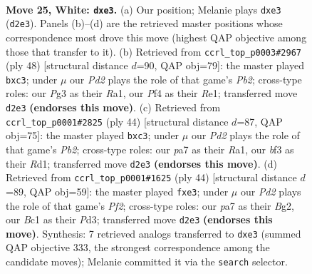 \documentclass[11pt]{article}
\begin{document}
\clearpage

\begin{figure}[p]\centering
\begin{subfigure}{0.46\textwidth}\centering
\resizebox{\linewidth}{!}{%
\newchessgame
\chessboard[
  setfen={1r3r2/pp4k1/6pp/2pB3n/4pP1P/N3bbP1/PP1P4/1RB2K2 w - - 0 25},
  showmover=false,
  pgfstyle=straightmove, color=movearrow, markmove={d2-e3}
]}
\caption{}
\end{subfigure}\hfill
\begin{subfigure}{0.46\textwidth}\centering
\resizebox{\linewidth}{!}{%
\newchessgame
\chessboard[
  setfen={1r3rk1/1Bp1npp1/p1P1b2p/8/2p2B2/2b4P/PP3PP1/R3R1K1 w - - 0 25},
  showmover=false,
  pgfstyle=straightmove, color=movearrow, markmove={b2-c3}
]}
\caption{}
\end{subfigure}
\\[4pt]
\begin{subfigure}{0.46\textwidth}\centering
\resizebox{\linewidth}{!}{%
\newchessgame
\chessboard[
  setfen={2r3k1/1b1r1p2/pB3n1p/4p1p1/P3P1P1/2bB3P/1PP1K3/R2R4 w - - 0 23},
  showmover=false,
  pgfstyle=straightmove, color=movearrow, markmove={b2-c3}
]}
\caption{}
\end{subfigure}\hfill
\begin{subfigure}{0.46\textwidth}\centering
\resizebox{\linewidth}{!}{%
\newchessgame
\chessboard[
  setfen={5rk1/1r1b1p1p/2np2p1/4p3/1PR1P3/3PbNPP/5PB1/1R4K1 w - - 0 23},
  showmover=false,
  pgfstyle=straightmove, color=movearrow, markmove={f2-e3}
]}
\caption{}
\end{subfigure}
\caption{\textbf{Move 25, White: \texttt{dxe3}.} (a) Our position; Melanie plays \texttt{dxe3} (\texttt{d2e3}). Panels (b)--(d) are the retrieved master positions whose correspondence most drove this move (highest QAP objective among those that transfer to it). (b) Retrieved from \texttt{ccrl\_top\_p0003\#2967} (ply 48) [structural distance $d$=90, QAP obj=79]: the master played \texttt{bxc3}; under $\mu$ our \emph{Pd2} plays the role of that game's \emph{Pb2}; cross-type roles: our \emph{P}g3 as their \emph{R}a1, our \emph{P}f4 as their \emph{R}e1; transferred move \texttt{d2e3} \textbf{(endorses this move)}. (c) Retrieved from \texttt{ccrl\_top\_p0001\#2825} (ply 44) [structural distance $d$=87, QAP obj=75]: the master played \texttt{bxc3}; under $\mu$ our \emph{Pd2} plays the role of that game's \emph{Pb2}; cross-type roles: our \emph{p}a7 as their \emph{R}a1, our \emph{b}f3 as their \emph{R}d1; transferred move \texttt{d2e3} \textbf{(endorses this move)}. (d) Retrieved from \texttt{ccrl\_top\_p0001\#1625} (ply 44) [structural distance $d$=89, QAP obj=59]: the master played \texttt{fxe3}; under $\mu$ our \emph{Pd2} plays the role of that game's \emph{Pf2}; cross-type roles: our \emph{p}a7 as their \emph{B}g2, our \emph{B}c1 as their \emph{P}d3; transferred move \texttt{d2e3} \textbf{(endorses this move)}. Synthesis: 7 retrieved analogs transferred to \texttt{dxe3} (summed QAP objective 333, the strongest correspondence among the candidate moves); Melanie committed it via the \texttt{search} selector.}
\label{fig:thought-m48}
\end{figure}
\end{document}
